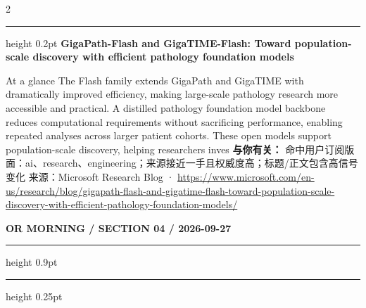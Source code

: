 \documentclass[10.5pt]{ctexart}
\begin{document}
\begin{multicols}{2}
\vspace{2mm}
\hrule height 0.2pt
\vspace{2mm}
{\large\bfseries GigaPath-Flash and GigaTIME-Flash: Toward population-scale discovery with efficient pathology foundation models}\par
At a glance The Flash family extends GigaPath and GigaTIME with dramatically improved efficiency, making large-scale pathology research more accessible and practical. A distilled pathology foundation model backbone reduces computational requirements without sacrificing performance, enabling repeated analyses across larger patient cohorts. These open models support population-scale discovery, helping researchers inves
\textbf{与你有关：} 命中用户订阅版面：ai、research、engineering；来源接近一手且权威度高；标题/正文包含高信号变化
{\footnotesize\color{ormuted} 来源：Microsoft Research Blog · \url{https://www.microsoft.com/en-us/research/blog/gigapath-flash-and-gigatime-flash-toward-population-scale-discovery-with-efficient-pathology-foundation-models/}}
\end{multicols}
\newpage
{\small\bfseries OR MORNING / SECTION 04 / 2026-09-27}
\vspace{2mm}
\hrule height 0.9pt
\vspace{1.5mm}
\hrule height 0.25pt
\vspace{4mm}
\end{document}
